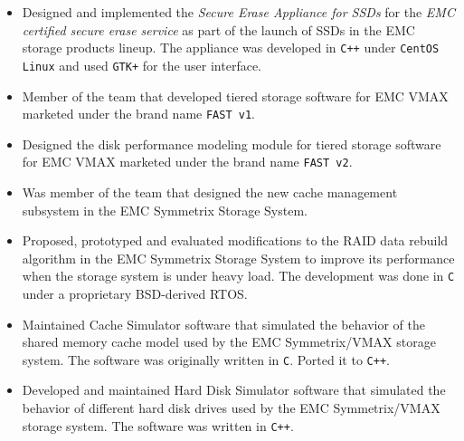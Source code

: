 { 
	\begin{itemize}
		\item Designed and implemented the {\em Secure Erase Appliance for SSDs}
			for the {\em EMC certified secure erase service} as part of the
			launch of SSDs in the EMC storage products lineup. The appliance was
			developed in \texttt{C++} under \texttt{CentOS Linux} and used 
			\texttt{GTK+} for the user interface.
		\item Member of the team that developed tiered storage software for
			EMC VMAX marketed under the brand name \texttt{FAST v1}.
		\item Designed the disk performance modeling module for tiered storage
			software for EMC VMAX marketed under the brand name \texttt{FAST v2}.
	\end{itemize}
}
{
	\begin{itemize}
		\item Was member of the team that designed the new cache management
			subsystem in the EMC Symmetrix Storage System.
		\item Proposed, prototyped and evaluated modifications to the RAID data rebuild algorithm
			in the EMC Symmetrix Storage System to improve its performance when
			the storage system is under heavy load. The
			development was done in \texttt{C} under a proprietary BSD-derived RTOS.
		\item Maintained Cache Simulator software that simulated the behavior of the 
			shared memory cache model used by the EMC Symmetrix/VMAX storage system.
			The software was originally written in \texttt{C}. Ported it to \texttt{C++}.
		\item Developed and maintained Hard Disk Simulator software that
			simulated the behavior of different hard disk drives used by the
			EMC Symmetrix/VMAX storage system. The software was written in \texttt{C++}.
	\end{itemize}
}
